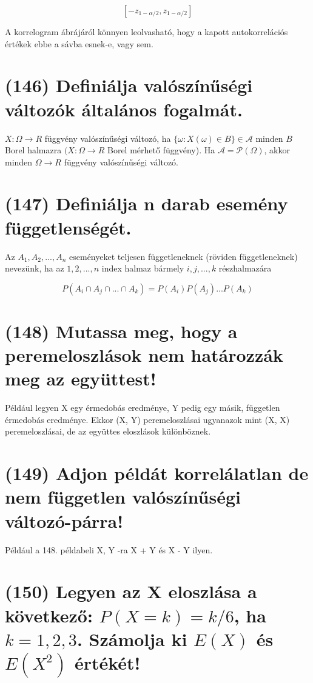 \documentclass[12p]{article}
\begin{document}
$$[-z_{1-\alpha/2},z_{1-\alpha/2}]$$

A korrelogram ábrájáról könnyen leolvasható, hogy a kapott autokorrelációs
értékek ebbe a sávba esnek-e, vagy sem.

\section{(146) Definiálja valószínűségi változók általános fogalmát.}

$X : \Omega \rightarrow R$ függvény valószínűségi változó, ha $\{\omega: X(\omega) \in B\} \in \mathscr{A}$ minden $B$ Borel halmazra $(X: \Omega \rightarrow R$ Borel mérhető függvény).
Ha $\mathscr{A} = \mathscr{P}(\Omega)$, akkor minden $\Omega \rightarrow R$ függvény valószínűségi változó.


\section{(147) Definiálja n darab esemény függetlenségét.}

Az $A_1,A_2, ..., A_n$ eseményeket teljesen függetleneknek (röviden függetleneknek) nevezünk, ha az ${1, 2, ..., n}$ index halmaz bármely ${i, j, ..., k}$ részhalmazára

$$P(A_i \cap A_j \cap ... \cap A_k) = P(A_i)P(A_j)...P(A_k)$$

\section{(148) Mutassa meg, hogy a peremeloszlások nem határozzák meg az együttest!}

Például legyen X egy érmedobás eredménye, Y pedig egy másik, független érmedobás eredménye. Ekkor (X, Y) peremeloszlásai ugyanazok mint (X, X) peremeloszlásai, de az együttes eloszlások különböznek.

\section{(149) Adjon példát korrelálatlan de nem független valószínűségi változó-párra!}

Például a 148. példabeli X, Y -ra X + Y és X - Y ilyen.

\section{(150) Legyen az X eloszlása a következő: $P(X = k) = k/6$, ha $k = 1, 2, 3$. Számolja ki $E(X)$ és $E(X^2)$ értékét!}
\end{document}

